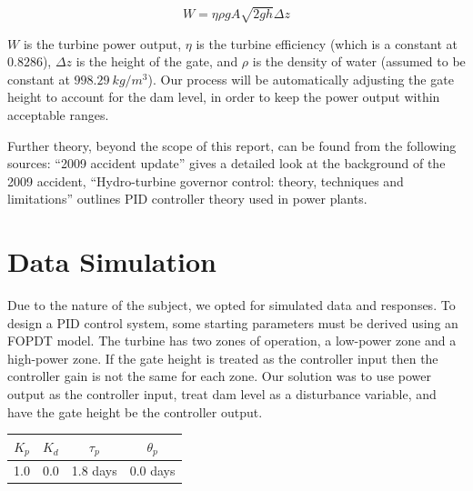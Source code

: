 \documentclass{article}
\begin{document}
\begin{multicols*}{2}
        \begin{equation}\label{powerEq}
            W=\eta \rho gA\sqrt{2gh}\Delta z
        \end{equation}

        $W$ is the turbine power output, $\eta$ is the turbine efficiency (which is a constant at $0.8286$), $\Delta z$ is the height of the gate, and $\rho$ is the density of water (assumed to be constant at $998.29\ kg/m^3$). Our process will be automatically adjusting the gate height to account for the dam level, in order to keep the power output within acceptable ranges.

        Further theory, beyond the scope of this report, can be found from the following sources: “2009 accident update” \cite{SayanoAccidentUpdate} gives a detailed look at the background of the 2009 accident, “Hydro-turbine governor control: theory, techniques and limitations” \cite{htgc} outlines PID controller theory used in power plants.

        \section{Data Simulation}

        Due to the nature of the subject, we opted for simulated data and responses. To design a PID control system, some starting parameters must be derived using an FOPDT model. The turbine has two zones of operation, a low-power zone and a high-power zone. If the gate height is treated as the controller input then the controller gain is not the same for each zone. Our solution was to use power output as the controller input, treat dam level as a disturbance variable, and have the gate height be the controller output.

        \vspace{1ex}

        \begin{minipage}{0.9\columnwidth}
            \label{foParams}
            \vspace{-1ex}
            \begin{center}
            \begin{tabular}{cccc}
                    \toprule
                    $K_p$ & $K_d$ & $\tau_p$ & $\theta_p$ \\
                    \midrule
                    1.0 & 0.0 & 1.8 days & 0.0 days
                \end{tabular}
            \end{center}
        \end{minipage}


\end{multicols*}
\end{document}
